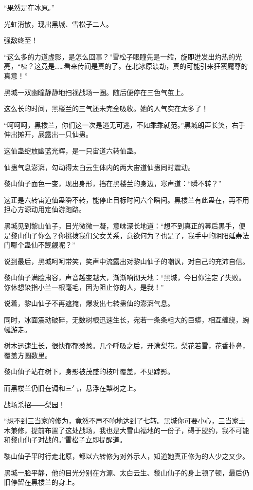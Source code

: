 \begin{this_body}
“果然是在冰原。”

光虹消散，现出黑城、雪松子二人。

强敌终至！

“这么多的力道虚影，是怎么回事？”雪松子眼瞳先是一缩，旋即迸发出灼热的光亮，“咦？这竟是……看来传闻是真的了。在北冰原渡劫，真的可能引来狂蛮魔尊的真意！”

黑城一双幽瞳静静地扫视战场一圈。随后便停在三色气茧上。

这么长的时间，黑楼兰的三气还未完全吸收。她的人气实在太多了！

“呵呵呵，黑楼兰，你们这一次是逃无可逃，不如乖乖就范。”黑城朗声长笑，右手伸出摊开，展露出一只仙蛊。

这仙蛊绽放幽蓝光辉，是一只宙道六转仙蛊。

仙蛊气息澎湃，勾动得太白云生体内的两大宙道仙蛊同时震动。

黎山仙子面色一变，现出身形，挡在黑楼兰的身边，寒声道：“瞬不转？”

这正是六转宙道仙蛊瞬不转，能停止目标时间六个瞬间。黑楼兰有此蛊在，再不用担心方源动用定仙游跑路。

黑城见到黎山仙子，目光微微一凝，意味深长地道：“想不到真正的幕后黑手，便是黎山仙子你么？你挑拨我们父女关系，意欲何为？也是了，我手中的阴阳延寿法门哪个蛊仙不觊觎呢？”

说到最后，黑城呵呵带笑，笑声中流露出对黎山仙子的嘲讽，对自己的充沛自信。

黎山仙子满脸肃容，声音越变越大，渐渐响彻天地：“黑城，今日你注定了失败。你休想染指小兰一根毫毛，因为阻止你的人，是我！”

说着，黎山仙子不再遮掩，爆发出七转蛊仙的澎湃气息。

同时，冰面震动破碎，无数树根迅速生长，宛若一条条粗大的巨蟒，相互缠绕，蜿蜒游走。

树木迅速生长，很快郁郁葱葱。几个呼吸之后，开满梨花。梨花若雪，花香扑鼻，覆盖方圆数里。

黎山仙子站在树下，身影被茂盛的枝叶覆盖，不见踪影。

而黑楼兰仍旧在调和三气，悬浮在梨树之上。

战场杀招――梨园！

“想不到三当家的修为，竟然不声不响地达到了七转。黑城你可要小心，三当家土木兼修，提前布置了这处战场，我也是大雪山福地的一份子，碍于盟约，我不可能和黎山仙子对战的。”雪松子立即提醒道。

黎山仙子平时行走北原，都以六转修为对外示人，知道她真正修为的人少之又少。

黑城一脸平静，他的目光分别在方源、太白云生、黎山仙子的身上顿了顿，最后仍旧停留在黑楼兰的身上。


\end{this_body}
